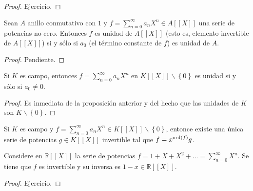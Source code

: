 \documentclass[12pt]{report}
\theoremstyle{largebreak}
\newcommand{\ord}[1]{\ensuremath{\textup{ord}\left(#1\right)}}
\begin{document}
    \begin{proof}
        Ejercicio.
    \end{proof}

    \begin{propo}
        Sean $A$ anillo conmutativo con $1$ y $f=\sum_{ n=0}^\infty a_nX^n\in A[[X]]$ una serie de potencias no cero. Entonces $f$ es unidad de $A[[X]]$ (esto es, elemento invertible de $A[[X]]$) si y sólo si $a_0$ (el término constante de $f$) es unidad de $A$.
    \end{propo}

    \begin{proof}
        Pendiente.
    \end{proof}

    \begin{cor}
        Si $K$ es campo, entonces $f=\sum_{ n=0}^\infty a_nX^n$ en $K[[X]]\backslash\left\{0\right\}$ es unidad si y sólo si $a_0\neq0$.
    \end{cor}

    \begin{proof}
        Es inmediata de la proposición anterior y del hecho que las unidades de $K$ son $K\backslash\left\{0\right\}$.
    \end{proof}

    \begin{cor}
        Si $K$ es campo y $f=\sum_{ n=0}^\infty a_nX^n\in K[[X]]\backslash\left\{0\right\}$, entonce existe una única serie de potencias $g\in K[[X]]$ invertible tal que $f=x^{\ord{f}}g$.
    \end{cor}

    \begin{exa}
        Considere en $\mathbb{R}[[X]]$ la serie de potencias $f=1+X+X^2+...=\sum_{ n=0}^\infty X^n$. Se tiene que $f$ es invertible y su inversa es $1-x\in\mathbb{R}[[X]]$.
    \end{exa}

    \begin{proof}
        Ejercicio.
    \end{proof}
\end{document}
